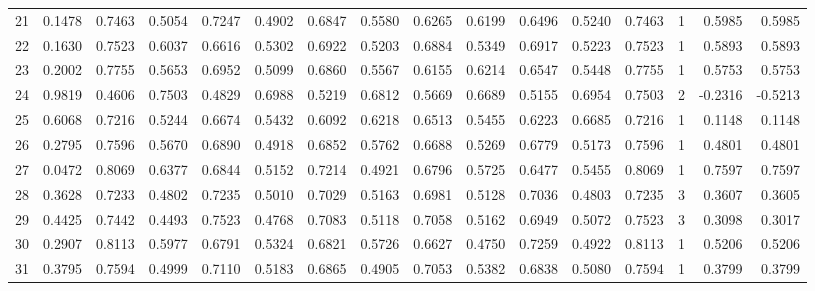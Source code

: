 \begin{tabular}{lrrrrrrrrrrrrrrr}
21  &      0.1478 &  0.7463 &  0.5054 &  0.7247 &  0.4902 &  0.6847 &  0.5580 &  0.6265 &  0.6199 &  0.6496 &   0.5240 &     0.7463 &      1 &                    0.5985 &                     0.5985 \\
22  &      0.1630 &  0.7523 &  0.6037 &  0.6616 &  0.5302 &  0.6922 &  0.5203 &  0.6884 &  0.5349 &  0.6917 &   0.5223 &     0.7523 &      1 &                    0.5893 &                     0.5893 \\
23  &      0.2002 &  0.7755 &  0.5653 &  0.6952 &  0.5099 &  0.6860 &  0.5567 &  0.6155 &  0.6214 &  0.6547 &   0.5448 &     0.7755 &      1 &                    0.5753 &                     0.5753 \\
24  &      0.9819 &  0.4606 &  0.7503 &  0.4829 &  0.6988 &  0.5219 &  0.6812 &  0.5669 &  0.6689 &  0.5155 &   0.6954 &     0.7503 &      2 &                   -0.2316 &                    -0.5213 \\
25  &      0.6068 &  0.7216 &  0.5244 &  0.6674 &  0.5432 &  0.6092 &  0.6218 &  0.6513 &  0.5455 &  0.6223 &   0.6685 &     0.7216 &      1 &                    0.1148 &                     0.1148 \\
26  &      0.2795 &  0.7596 &  0.5670 &  0.6890 &  0.4918 &  0.6852 &  0.5762 &  0.6688 &  0.5269 &  0.6779 &   0.5173 &     0.7596 &      1 &                    0.4801 &                     0.4801 \\
27  &      0.0472 &  0.8069 &  0.6377 &  0.6844 &  0.5152 &  0.7214 &  0.4921 &  0.6796 &  0.5725 &  0.6477 &   0.5455 &     0.8069 &      1 &                    0.7597 &                     0.7597 \\
28  &      0.3628 &  0.7233 &  0.4802 &  0.7235 &  0.5010 &  0.7029 &  0.5163 &  0.6981 &  0.5128 &  0.7036 &   0.4803 &     0.7235 &      3 &                    0.3607 &                     0.3605 \\
29  &      0.4425 &  0.7442 &  0.4493 &  0.7523 &  0.4768 &  0.7083 &  0.5118 &  0.7058 &  0.5162 &  0.6949 &   0.5072 &     0.7523 &      3 &                    0.3098 &                     0.3017 \\
30  &      0.2907 &  0.8113 &  0.5977 &  0.6791 &  0.5324 &  0.6821 &  0.5726 &  0.6627 &  0.4750 &  0.7259 &   0.4922 &     0.8113 &      1 &                    0.5206 &                     0.5206 \\
31  &      0.3795 &  0.7594 &  0.4999 &  0.7110 &  0.5183 &  0.6865 &  0.4905 &  0.7053 &  0.5382 &  0.6838 &   0.5080 &     0.7594 &      1 &                    0.3799 &                     0.3799 \\

\end{tabular}

